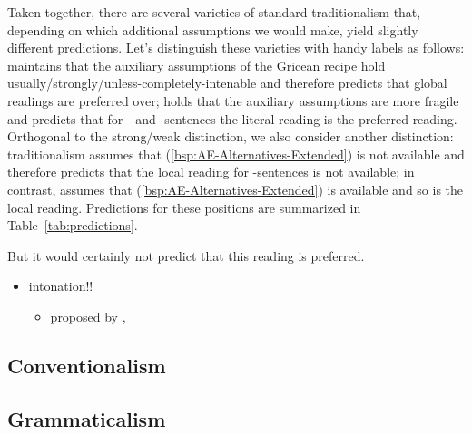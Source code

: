 \documentclass[fleqn,reqno,10pt,draft]{article}
\newcommand{\as}{\acro{as}}
\renewcommand{\es}{\acro{es}}
\newcommand{\mymark}[1]{{\color{mycol}{#1}}}
\begin{document}
Taken together, there are several varieties of standard traditionalism
that, depending on which additional assumptions we would make, yield
slightly different predictions. Let's distinguish these varieties with
handy labels as follows: \mymark{the strong variety of traditionalism}
maintains that the auxiliary assumptions of the Gricean recipe hold
usually/strongly/unless-completely-intenable and therefore predicts
that global readings are preferred over; \mymark{the weak variety of
  traditionalism} holds that the auxiliary assumptions are more
fragile and predicts that for \as- and \es-sentences the literal
reading is the preferred reading. Orthogonal to the strong/weak
distinction, we also consider another distinction: \mymark{restricted}
traditionalism assumes that (\ref{bsp:AE-Alternatives-Extended}) is
not available and therefore predicts that the local reading for
\as-sentences is not available; in contrast, \mymark{unrestricted
  traditionalism} assumes that (\ref{bsp:AE-Alternatives-Extended}) is
available and so is the local reading. Predictions for these positions
are summarized in Table~\ref{tab:predictions}.



 But it would certainly
not predict that this reading is preferred. 


\begin{itemize}
\item intonation!!
  \begin{itemize}
  \item proposed by
    \citet{Horn2006:The-Border-Wars,Geurts2009:Scalar-Implicat,Geurts2010:Quantity-Implic},
    \citep[c.f.][]{ChemlaSpector2010:Experimental-Ev}
  \end{itemize}
\end{itemize}


\bigskip


\subsection{Conventionalism}
\label{sec:conventionalism}

\subsection{Grammaticalism}
\label{sec:grammaticalism}
\end{document}
